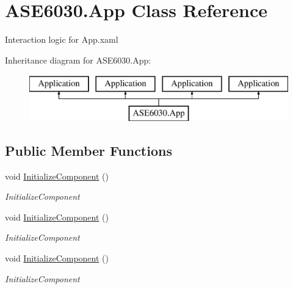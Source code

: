 \hypertarget{class_a_s_e6030_1_1_app}{}\section{A\+S\+E6030.\+App Class Reference}
\label{class_a_s_e6030_1_1_app}


Interaction logic for App.\+xaml  


Inheritance diagram for A\+S\+E6030.\+App\+:\begin{figure}[H]
\begin{center}
\leavevmode
\includegraphics[height=2.000000cm]{class_a_s_e6030_1_1_app}
\end{center}
\end{figure}
\subsection*{Public Member Functions}
\begin{DoxyCompactItemize}
\item 
void \hyperlink{class_a_s_e6030_1_1_app_a3e92cf5b5ce00ab4725d8b49d4f4608b}{Initialize\+Component} ()
\begin{DoxyCompactList}\small\item\em Initialize\+Component \end{DoxyCompactList}\item 
void \hyperlink{class_a_s_e6030_1_1_app_a3e92cf5b5ce00ab4725d8b49d4f4608b}{Initialize\+Component} ()
\begin{DoxyCompactList}\small\item\em Initialize\+Component \end{DoxyCompactList}\item 
void \hyperlink{class_a_s_e6030_1_1_app_a3e92cf5b5ce00ab4725d8b49d4f4608b}{Initialize\+Component} ()
\begin{DoxyCompactList}\small\item\em Initialize\+Component \end{DoxyCompactList}\end{DoxyCompactItemize}
